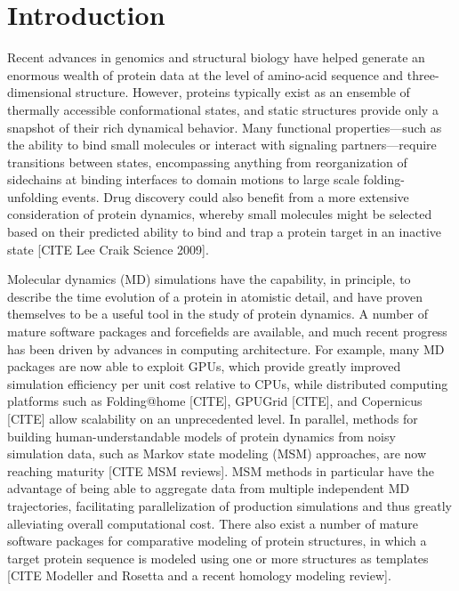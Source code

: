 \documentclass[aps,pre,twocolumn,nofootinbib,superscriptaddress,linenumbers]{revtex4-1}
\begin{document}
\maketitle

\section{Introduction}
\label{section:introduction}

Recent advances in genomics and structural biology have helped generate an enormous wealth of protein data at the level of amino-acid sequence and three-dimensional structure.
However, proteins typically exist as an ensemble of thermally accessible conformational states, and static structures provide only a snapshot of their rich dynamical behavior.
Many functional properties---such as the ability to bind small molecules or interact with signaling partners---require transitions between states, encompassing anything from reorganization of sidechains at binding interfaces to domain motions to large scale folding-unfolding events.
Drug discovery could also benefit from a more extensive consideration of protein dynamics, whereby small molecules might be selected based on their predicted ability to bind and trap a protein target in an inactive state [CITE Lee Craik Science 2009].

Molecular dynamics (MD) simulations have the capability, in principle, to describe the time evolution of a protein in atomistic detail, and have proven themselves to be a useful tool in the study of protein dynamics.
A number of mature software packages and forcefields are available, and much recent progress has been driven by advances in computing architecture.
For example, many MD packages are now able to exploit GPUs, which provide greatly improved simulation efficiency per unit cost relative to CPUs, while distributed computing platforms such as Folding@home [CITE], GPUGrid [CITE], and Copernicus [CITE] allow scalability on an unprecedented level.
In parallel, methods for building human-understandable models of protein dynamics from noisy simulation data, such as Markov state modeling (MSM) approaches, are now reaching maturity [CITE MSM reviews].
MSM methods in particular have the advantage of being able to aggregate data from multiple independent MD trajectories, facilitating parallelization of production simulations and thus greatly alleviating overall computational cost.
There also exist a number of mature software packages for comparative modeling of protein structures, in which a target protein sequence is modeled using one or more structures as templates [CITE Modeller and Rosetta and a recent homology modeling review].
\end{document}
